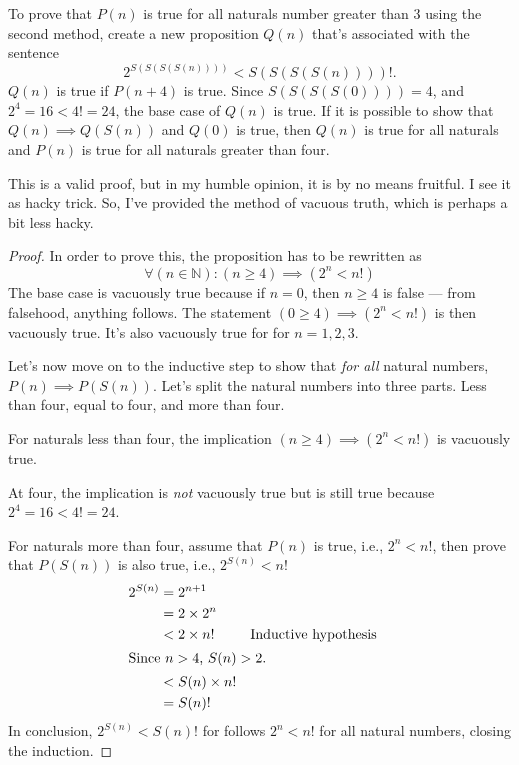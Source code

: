 To prove that \(P(n)\) is true for all naturals number greater than \(3\) using the second method,
create a new proposition \(Q(n)\) that's associated with the sentence
\begin{equation*}
  2^{S(S(S(S(n))))} < S(S(S(S(n))))!.
\end{equation*}
\(Q(n)\) is true if \(P(n + 4)\) is true. Since \(S(S(S(S(0)))) = 4\), and \(2^4 = 16 < 4! = 24\),
the base case of \(Q(n)\) is true. If it is possible to show that \(Q(n) \implies Q(S(n))\) and
\(Q(0)\) is true, then \(Q(n)\) is true for all naturals and \(P(n)\) is true for all naturals
greater than four.

This is a valid proof, but in my humble opinion, it is by no means fruitful. I see it as hacky
trick. So, I've provided the method of vacuous truth, which is perhaps a bit less hacky.

\begin{proof}
  In order to prove this, the proposition has to be rewritten as
  \begin{equation*}
    \forall (n \in \mathbb{N}) : (n \geq 4) \implies (2^n < n!)
  \end{equation*}
  \basecase The base case is vacuously true because if \(n = 0\), then \(n \geq 4\) is false ---
  from falsehood, anything follows. The statement \((0 \geq 4) \implies (2^n < n!)\)
  is then vacuously true. It's also vacuously true for for \(n = 1, 2, 3\).

  Let's now move on to the inductive step to show that \emph{for all} natural numbers,
  \(P(n) \implies P(S(n))\). Let's split the natural numbers into three parts. Less than four, equal
  to four, and more than four.

  \inductivestep For naturals less than four, the implication \((n \geq 4) \implies (2^n < n!)\)
  is vacuously true.

  At four, the implication is \emph{not} vacuously true but is still true because
  \(2^4 = 16 < 4! = 24\).

  For naturals more than four, assume that \(P(n)\) is true, i.e., \(2^n < n!\), then prove
  that \(P(S(n))\) is also true, i.e., \(2^{S(n)} < n!\)
  \begin{align*}
    2^{S(n)} & = 2^{n+1}                                           \\
             & = 2 \times 2^n                                      \\
             & < 2 \times n!    &  & \textrm{Inductive hypothesis} \\
    \shortintertext{Since \(n > 4\), \(S(n) > 2\).}
             & < S(n) \times n!                                    \\
             & = S(n)!
  \end{align*}
  In conclusion, \(2^{S(n)} < S(n)!\) for follows \(2^n < n!\) for all natural numbers, closing the
  induction.
\end{proof}

